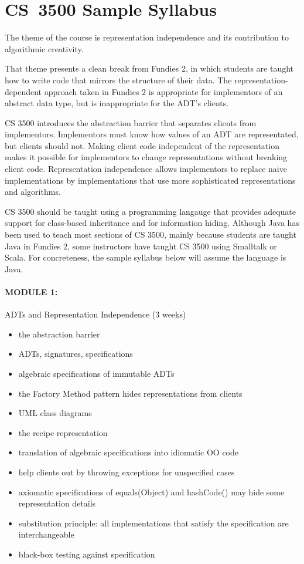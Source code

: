\documentclass[11pt]{article}
\begin{document}
\section{CS~3500 Sample Syllabus}

The theme of the course is representation independence and
its contribution to algorithmic creativity.

That theme presents a clean break from Fundies 2, in which
students are taught how to write code that mirrors the
structure of their data.  The representation-dependent
approach taken in Fundies 2 is appropriate for implementors
of an abstract data type, but is inappropriate for the ADT's
clients.

CS 3500 introduces the abstraction barrier that separates
clients from implementors.  Implementors must know how values
of an ADT are representated, but clients should not.  Making
client code independent of the representation makes it possible
for implementors to change representations without breaking
client code.  Representation independence allows implementors
to replace naive implementations by implementations that use
more sophisticated representations and algorithms.

CS 3500 should be taught using a programming langauge that
provides adequate support for class-based inheritance and for
information hiding.  Although Java has been used to teach most
sections of CS 3500, mainly because students are taught Java in
Fundies 2, some instructors have taught CS 3500 using Smalltalk
or Scala.  For concreteness, the sample syllabus below will
assume the language is Java.



\paragraph{MODULE 1:}
%
ADTs and Representation Independence (3 weeks)
%
\begin{itemize}
\item the abstraction barrier
\item ADTs, signatures, specifications
\item algebraic specifications of immutable ADTs
\item the Factory Method pattern hides representations from clients
\item UML class diagrams
\item the recipe representation
\item translation of algebraic specifications into idiomatic OO code
\item help clients out by throwing exceptions for unspecified cases
\item axiomatic specifications of equals(Object) and hashCode()
      may hide some representation details
\item substitution principle:
      all implementations that satisfy the specification are interchangeable
\item black-box testing against specification
\end{itemize}
\end{document}
